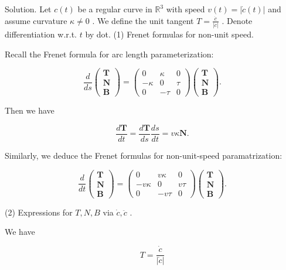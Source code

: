 \documentclass[10pt]{article}
\begin{document}
Solution. Let \(c\left( t\right)\) be a regular curve in \({\mathbb{R}}^{3}\) with speed \(v\left( t\right)  = \left| {\dot{c}\left( t\right) }\right|\) and assume curvature \(\kappa  \neq  0\) . We define the unit tangent \(T = \frac{\dot{c}}{\left| \dot{c}\right| }\) . Denote differentiation w.r.t. \(t\) by dot. (1) Frenet formulas for non-unit speed.

Recall the Frenet formula for arc length parameterization:

\[
\frac{d}{ds}\left( \begin{array}{l} \mathbf{T} \\  \mathbf{N} \\  \mathbf{B} \end{array}\right)  = \left( \begin{matrix} 0 & \kappa & 0 \\   - \kappa & 0 & \tau \\  0 &  - \tau & 0 \end{matrix}\right) \left( \begin{array}{l} \mathbf{T} \\  \mathbf{N} \\  \mathbf{B} \end{array}\right) .
\]

Then we have

\[
\frac{d\mathbf{T}}{dt} = \frac{d\mathbf{T}}{ds}\frac{ds}{dt} = {v\kappa }\mathbf{N}.
\]

Similarly, we deduce the Frenet formulas for non-unit-speed paramatrization:

\[
\frac{d}{dt}\left( \begin{array}{l} \mathbf{T} \\  \mathbf{N} \\  \mathbf{B} \end{array}\right)  = \left( \begin{matrix} 0 & {v\kappa } & 0 \\   - {v\kappa } & 0 & {v\tau } \\  0 &  - {v\tau } & 0 \end{matrix}\right) \left( \begin{array}{l} \mathbf{T} \\  \mathbf{N} \\  \mathbf{B} \end{array}\right) .
\]

(2) Expressions for \(T,N,B\) via \(\dot{c},\ddot{c}\) .

We have

\[
T = \frac{\dot{c}}{\left| \dot{c}\right| }
\]
\end{document}
